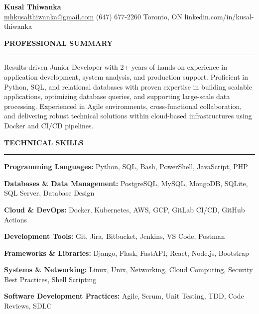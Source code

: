 \documentclass[10pt,letterpaper]{article}
\begin{document}
\begin{center}
{\LARGE\textbf{Kusal Thiwanka}}\\[3pt]
\href{mailto:mhkusalthiwanka@gmail.com}{mhkusalthiwanka@gmail.com}\hspace{2em}%
(647) 677{-}2260\hspace{2em}%
Toronto, ON\hspace{2em}
linkedin.com/in/kusal-thiwanka
\end{center}

\vspace{6pt}

\textbf{PROFESSIONAL SUMMARY}\\[-8pt]
\noindent\rule{\textwidth}{1pt}

\vspace{-2pt}

Results-driven Junior Developer with 2+ years of hands-on experience in application development, system analysis, and production support. Proficient in Python, SQL, and relational databases with proven expertise in building scalable applications, optimizing database queries, and supporting large-scale data processing. Experienced in Agile environments, cross-functional collaboration, and delivering robust technical solutions within cloud-based infrastructures using Docker and CI/CD pipelines.

\vspace{8pt}

\textbf{TECHNICAL SKILLS}\\[-8pt]
\noindent\rule{\textwidth}{1pt}

\vspace{-2pt}

\textbf{Programming Languages:} Python, SQL, Bash, PowerShell, JavaScript, PHP

\textbf{Databases \& Data Management:} PostgreSQL, MySQL, MongoDB, SQLite, SQL Server, Database Design

\textbf{Cloud \& DevOps:} Docker, Kubernetes, AWS, GCP, GitLab CI/CD, GitHub Actions

\textbf{Development Tools:} Git, Jira, Bitbucket, Jenkins, VS Code, Postman

\textbf{Frameworks \& Libraries:} Django, Flask, FastAPI, React, Node.js, Bootstrap

\textbf{Systems \& Networking:} Linux, Unix, Networking, Cloud Computing, Security Best Practices, Shell Scripting

\textbf{Software Development Practices:} Agile, Scrum, Unit Testing, TDD, Code Reviews, SDLC
\end{document}
